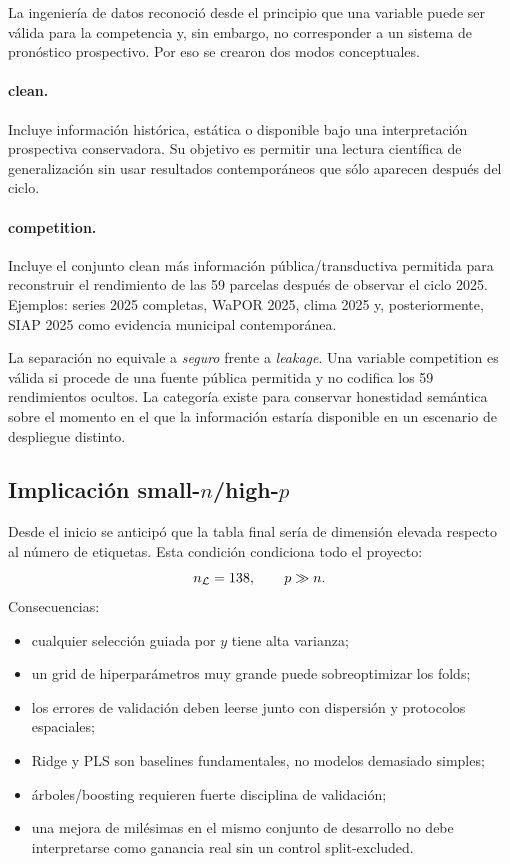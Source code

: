 La ingeniería de datos reconoció desde el principio que una variable puede ser válida para la
competencia y, sin embargo, no corresponder a un sistema de pronóstico prospectivo. Por eso se
crearon dos modos conceptuales.

\paragraph{clean.}
Incluye información histórica, estática o disponible bajo una interpretación prospectiva
conservadora. Su objetivo es permitir una lectura científica de generalización sin usar
resultados contemporáneos que sólo aparecen después del ciclo.

\paragraph{competition.}
Incluye el conjunto clean más información pública/transductiva permitida para reconstruir el
rendimiento de las 59 parcelas después de observar el ciclo 2025. Ejemplos: series 2025
completas, WaPOR 2025, clima 2025 y, posteriormente, SIAP 2025 como evidencia municipal
contemporánea.

La separación no equivale a \emph{seguro} frente a \emph{leakage}. Una variable competition es
válida si procede de una fuente pública permitida y no codifica los 59 rendimientos ocultos.
La categoría existe para conservar honestidad semántica sobre el momento en el que la
información estaría disponible en un escenario de despliegue distinto.

\subsection{Implicación small-\texorpdfstring{$n$}{n}/high-\texorpdfstring{$p$}{p}}

Desde el inicio se anticipó que la tabla final sería de dimensión elevada respecto al número
de etiquetas. Esta condición condiciona todo el proyecto:
\[
n_{\mathcal{L}}=138,\qquad p\gg n.
\]
Consecuencias:
\begin{itemize}
\item cualquier selección guiada por $y$ tiene alta varianza;
\item un grid de hiperparámetros muy grande puede sobreoptimizar los folds;
\item los errores de validación deben leerse junto con dispersión y protocolos espaciales;
\item Ridge y PLS son baselines fundamentales, no modelos demasiado simples;
\item árboles/boosting requieren fuerte disciplina de validación;
\item una mejora de milésimas en el mismo conjunto de desarrollo no debe interpretarse como
ganancia real sin un control split-excluded.
\end{itemize}

